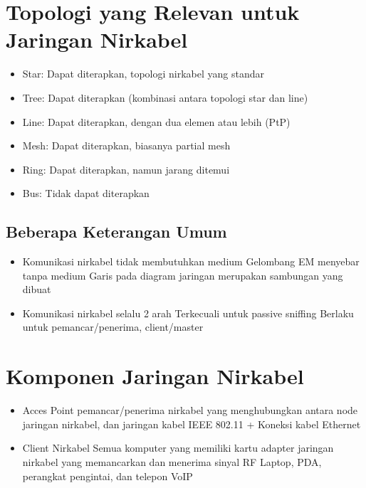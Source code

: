 \documentclass[a4paper,12pt]{article}
\begin{document}
\tableofcontents

\newpage

\section{Topologi yang Relevan untuk Jaringan Nirkabel}
\begin{itemize}
    \item Star: Dapat diterapkan, topologi nirkabel yang standar
    \item Tree: Dapat diterapkan (kombinasi antara topologi star dan line)
    \item Line: Dapat diterapkan, dengan dua elemen atau lebih (PtP)
    \item Mesh: Dapat diterapkan, biasanya partial mesh
    \item Ring: Dapat diterapkan, namun jarang ditemui
    \item Bus: Tidak dapat diterapkan
\end{itemize}

\subsection{Beberapa Keterangan Umum}
\begin{itemize}
    \item Komunikasi nirkabel tidak membutuhkan medium
        \subitem Gelombang EM menyebar tanpa medium
        \subitem Garis pada diagram jaringan merupakan sambungan yang dibuat

    \item Komunikasi nirkabel selalu 2 arah
        \subitem Terkecuali untuk passive sniffing
        \subitem Berlaku untuk pemancar/penerima, client/master
\end{itemize}

\section{Komponen Jaringan Nirkabel}
\begin{itemize}
    \item Acces Point
        \subitem pemancar/penerima nirkabel yang menghubungkan antara node jaringan nirkabel, dan jaringan kabel
        \subitem IEEE 802.11 + Koneksi kabel Ethernet

    \item Client Nirkabel
        \subitem Semua komputer yang memiliki kartu adapter jaringan nirkabel yang memancarkan dan menerima sinyal RF
        \sub Laptop, PDA, perangkat pengintai, dan telepon VoIP
\end{itemize}
\end{document}
